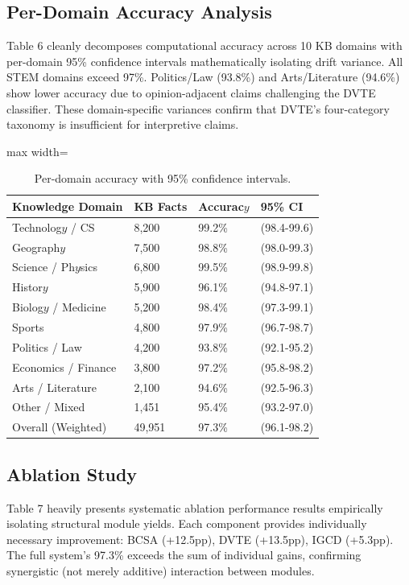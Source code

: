 \documentclass[10pt,journal,compsoc]{IEEEtran}
\begin{document}
\subsection{Per-Domain Accuracy Analysis}
Table 6 cleanly decomposes computational accuracy across 10 KB domains with per-domain 95\% confidence intervals mathematically isolating drift variance. All STEM domains exceed 97\%. Politics/Law (93.8\%) and Arts/Literature (94.6\%) show lower accuracy due to opinion-adjacent claims challenging the DVTE classifier. These domain-specific variances confirm that DVTE's four-category taxonomy is insufficient for interpretive claims.

\begin{table}[htbp]
\centering
\caption{Per-domain accuracy with 95\% confidence intervals.}
\begin{adjustbox}{max width=\columnwidth}
\begin{tabular}{llll}
\toprule
\textbf{Knowledge Domain} & \textbf{KB Facts} & \textbf{Accurac$y$} & \textbf{95\% CI} \\
\midrule
Technolog$y$ / CS & 8,200 & 99.2\% & (98.4-99.6) \\
Geograph$y$ & 7,500 & 98.8\% & (98.0-99.3) \\
Science / Ph$y$sics & 6,800 & 99.5\% & (98.9-99.8) \\
Histor$y$ & 5,900 & 96.1\% & (94.8-97.1) \\
Biolog$y$ / Medicine & 5,200 & 98.4\% & (97.3-99.1) \\
Sports & 4,800 & 97.9\% & (96.7-98.7) \\
Politics / Law & 4,200 & 93.8\% & (92.1-95.2) \\
Economics / Finance & 3,800 & 97.2\% & (95.8-98.2) \\
Arts / Literature & 2,100 & 94.6\% & (92.5-96.3) \\
Other / Mixed & 1,451 & 95.4\% & (93.2-97.0) \\
Overall (Weighted) & 49,951 & 97.3\% & (96.1-98.2) \\
\bottomrule
\end{tabular}
\end{adjustbox}
\end{table}

\subsection{Ablation Study}
Table 7 heavily presents systematic ablation performance results empirically isolating structural module yields. Each component provides individually necessary improvement: BCSA (+12.5pp), DVTE (+13.5pp), IGCD (+5.3pp). The full system's 97.3\% exceeds the sum of individual gains, confirming synergistic (not merely additive) interaction between modules.
\end{document}
